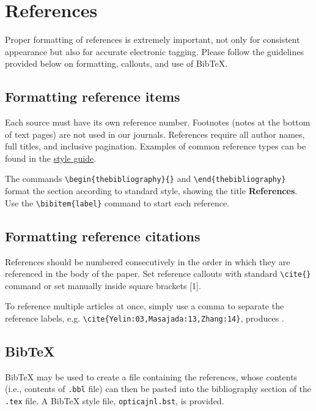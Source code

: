 \documentclass{optica-article}
\begin{document}
\section{References}
\label{sec:refs}
Proper formatting of references is extremely important, not only for consistent
appearance but also for accurate electronic tagging. Please follow the guidelines
provided below on formatting, callouts, and use of Bib\TeX.

\subsection{Formatting reference items}
Each source must have its own reference number. Footnotes (notes at the bottom
of text pages) are not used in our journals. References require all author
names, full titles, and inclusive pagination. Examples of common reference types
can be found in the  \href{https://opg.optica.org/jot/submit/style/oestyleguide.cfm}
{style guide}.


The commands \verb+\begin{thebibliography}{}+ and \verb+\end{thebibliography}+
format the section according to standard style, showing the title {\bfseries References}.
Use the \verb+\bibitem{label}+ command to start each reference.

\subsection{Formatting reference citations}
References should be numbered consecutively in the order in which they are
referenced in the body of the paper. Set reference callouts with standard
\verb+\cite{}+ command or set manually inside square brackets [1].

To reference multiple articles at once, simply use a comma to separate the
reference labels, e.g. \verb+\cite{Yelin:03,Masajada:13,Zhang:14}+, produces
\cite{Yelin:03,Masajada:13,Zhang:14}.

\subsection{Bib\TeX}
\label{sec:bibtex}
Bib\TeX{} may be used to create a file containing the references, whose contents
(i.e., contents of \texttt{.bbl} file) can then be pasted into the bibliography
section of the \texttt{.tex} file. A Bib\TeX{} style file, \texttt{opticajnl.bst},
is provided.
\end{document}
